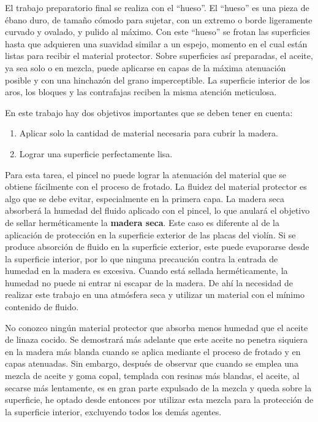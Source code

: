 \documentclass[12pt]{book}
\begin{document}
El trabajo preparatorio final se realiza con el ``hueso''. El ``hueso'' es una pieza de ébano duro, de tamaño cómodo para sujetar, con un extremo o borde ligeramente curvado y ovalado, y pulido al máximo. Con este ``hueso'' se frotan las superficies hasta que adquieren una suavidad similar a un espejo, momento en el cual están listas para recibir el material protector. Sobre superficies así preparadas, el aceite, ya sea solo o en mezcla, puede aplicarse en capas de la máxima atenuación posible y con una hinchazón del grano imperceptible. La superficie interior de los aros, los bloques y las contrafajas reciben la misma atención meticulosa.

En este trabajo hay dos objetivos importantes que se deben tener en cuenta:
\begin{enumerate}
    \item Aplicar solo la cantidad de material necesaria para cubrir la madera.
    \item Lograr una superficie perfectamente lisa.
\end{enumerate}

Para esta tarea, el pincel no puede lograr la atenuación del material que se obtiene fácilmente con el proceso de frotado. La fluidez del material protector es algo que se debe evitar, especialmente en la primera capa. La madera seca absorberá la humedad del fluido aplicado con el pincel, lo que anulará el objetivo de sellar herméticamente la \textbf{madera seca}. Este caso es diferente al de la aplicación de protección en la superficie exterior de las placas del violín. Si se produce absorción de fluido en la superficie exterior, este puede evaporarse desde la superficie interior, por lo que ninguna precaución contra la entrada de humedad en la madera es excesiva. Cuando está sellada herméticamente, la humedad no puede ni entrar ni escapar de la madera. De ahí la necesidad de realizar este trabajo en una atmósfera seca y utilizar un material con el mínimo contenido de fluido.

No conozco ningún material protector que absorba menos humedad que el aceite de linaza cocido. Se demostrará más adelante que este aceite no penetra siquiera en la madera más blanda cuando se aplica mediante el proceso de frotado y en capas atenuadas. Sin embargo, después de observar que cuando se emplea una mezcla de aceite y goma copal, templada con resinas más blandas, el aceite, al secarse más lentamente, es en gran parte expulsado de la mezcla y queda sobre la superficie, he optado desde entonces por utilizar esta mezcla para la protección de la superficie interior, excluyendo todos los demás agentes.
\end{document}
